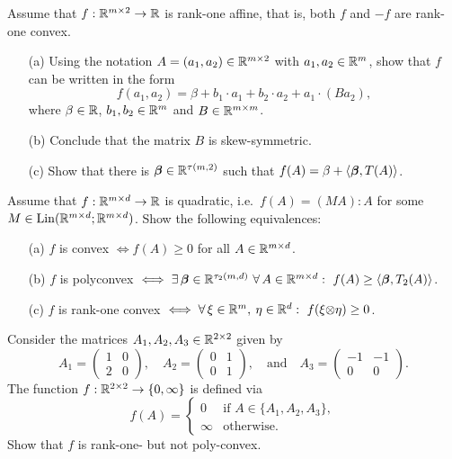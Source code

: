 \documentclass[12pt,a4paper]{article}
\begin{document}

\setcounter{AUFGABE}{39}


Assume that
$f:{\mathbb R}^{m\times 2} \to {\mathbb R}$ 
is rank-one affine,
that is,
both $f$ and $-f$ are rank-one convex.
\begin{enumerate}
\item[(a)] 
Using the notation $A=(a_1,a_2)\in {\mathbb R}^{m\times 2} $ with $a_1,a_2\in
{\mathbb R}^m$, show that $f$ can be written in the form
\[
f(a_1,a_2) = \beta + b_1 \cdot a_1 + b_2\cdot a_2 + a_1\cdot (Ba_2),
\]
where $\beta \in {\mathbb R}$, $b_1,b_2\in {\mathbb R}^m$ and $B\in {\mathbb R}^{m\times m}$. 
\item[(b)]
Conclude that the matrix $B$ is skew-symmetric. 
\item[(c)]
Show that there is ${\boldsymbol\beta} \in {\mathbb R}^{\tau(m,2)}$ such that 
$f(A)=\beta + \langle {\boldsymbol\beta}, T(A)\rangle$. 
\end{enumerate}


 Assume that $f:{\mathbb R}^{m\times d} \to {\mathbb R}$ is
quadratic, i.e.\ $f(A)=(MA){:} A $ for some $M\in
\mathrm{Lin}({\mathbb R}^{m\times d}; {\mathbb R}^{m\times d})$. Show the following equivalences:
\begin{enumerate}
\item[(a)]
$f$ is convex $\iff f(A)\geq 0$ for all
$A\in{\mathbb R}^{m\times d}$. 
\item[(b)]
$f$ is polyconvex $\iff\exists\, {\boldsymbol\beta}
\in {\mathbb R}^{\tau_2(m,d)}\ \forall\, A\in {\mathbb R}^{m\times d}:\ f(A)  \geq \langle
{\boldsymbol\beta} , T_2(A)\rangle$. 
\item[(c)]
$f$ is rank-one convex $\iff \forall\,\xi\in {\mathbb R}^m,\: \eta\in {\mathbb R}^{d}:\ f(\xi{\otimes}\eta)  \geq 0$.
\end{enumerate}

Consider the matrices $A_1,A_2,A_3\in{\mathbb R}^{2\times 2}$ given by
\[
A_1 = \begin{pmatrix}
1&0\\2&0
\end{pmatrix},\quad
A_2 = \begin{pmatrix}
0&1\\0&1
\end{pmatrix},
\quad\text{and}\quad
A_3 = \begin{pmatrix}
-1&-1\\0&0
\end{pmatrix}.
\]
The function $f:{\mathbb R}^{2\times2} \to\{0,\infty\}$ is defined via
\[
f(A) = \begin{cases}
0&\text{if }A\in\{A_1,A_2,A_3\},\\
\infty&\text{otherwise.}
\end{cases}
\]
Show that $f$ is rank-one- but not poly-convex.
\end{document}

